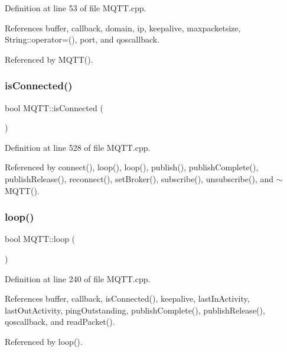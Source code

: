 Definition at line 53 of file M\+Q\+T\+T.\+cpp.



References buffer, callback, domain, ip, keepalive, maxpacketsize, String\+::operator=(), port, and qoscallback.



Referenced by M\+Q\+T\+T().

\mbox{\label{class_m_q_t_t_a57a5231fd3205682c56de70e57dd9d62}} 
\subsubsection{\texorpdfstring{is\+Connected()}{isConnected()}}
{\footnotesize\ttfamily bool M\+Q\+T\+T\+::is\+Connected (\begin{DoxyParamCaption}{ }\end{DoxyParamCaption})}



Definition at line 528 of file M\+Q\+T\+T.\+cpp.



Referenced by connect(), loop(), loop(), publish(), publish\+Complete(), publish\+Release(), reconnect(), set\+Broker(), subscribe(), unsubscribe(), and $\sim$\+M\+Q\+T\+T().

\mbox{\label{class_m_q_t_t_a5f9624e440c99d7ec0fb0a8c1a30d064}} 
\subsubsection{\texorpdfstring{loop()}{loop()}}
{\footnotesize\ttfamily bool M\+Q\+T\+T\+::loop (\begin{DoxyParamCaption}{ }\end{DoxyParamCaption})}



Definition at line 240 of file M\+Q\+T\+T.\+cpp.



References buffer, callback, is\+Connected(), keepalive, last\+In\+Activity, last\+Out\+Activity, ping\+Outstanding, publish\+Complete(), publish\+Release(), qoscallback, and read\+Packet().



Referenced by loop().


